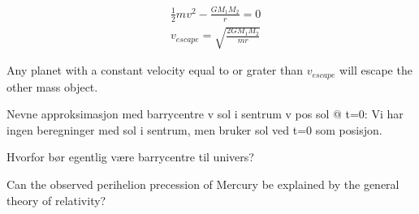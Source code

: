 \begin{align}
&\frac{1}{2}mv^2 - \frac{G	M_1M_2}{r}  = 0\\
& v_{escape} = \sqrt{ \frac{2G	M_1M_2}{mr}}
\end{align}

Any planet with a constant velocity equal to or grater than $ v_{escape} $ will escape the other  mass object. 






Nevne approksimasjon med barrycentre v sol i sentrum v pos sol @ t=0:
Vi har ingen beregninger med sol i sentrum, men bruker sol ved t=0 som posisjon. 

Hvorfor bør egentlig være barrycentre til univers?


Can the observed perihelion precession of Mercury be explained by the general theory of relativity?



